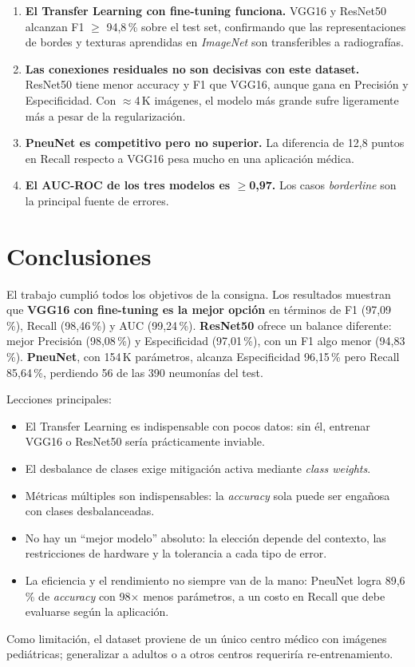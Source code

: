 \documentclass[1p,12pt]{elsarticle}
\begin{document}
\begin{enumerate}
  \item \textbf{El Transfer Learning con fine-tuning funciona.} VGG16 y ResNet50 alcanzan F1 $\geq$ 94,8\,\% sobre el test set, confirmando que las representaciones de bordes y texturas aprendidas en \textit{ImageNet} son transferibles a radiografías.
  \item \textbf{Las conexiones residuales no son decisivas con este dataset.} ResNet50 tiene menor accuracy y F1 que VGG16, aunque gana en Precisión y Especificidad. Con $\approx$4\,K imágenes, el modelo más grande sufre ligeramente más a pesar de la regularización.
  \item \textbf{PneuNet es competitivo pero no superior.} La diferencia de 12,8 puntos en Recall respecto a VGG16 pesa mucho en una aplicación médica.
  \item \textbf{El AUC-ROC de los tres modelos es $\geq$0,97.} Los casos \textit{borderline} son la principal fuente de errores.
\end{enumerate}

\section{Conclusiones}
\label{sec:conclusiones}

El trabajo cumplió todos los objetivos de la consigna. Los resultados muestran que \textbf{VGG16 con fine-tuning es la mejor opción} en términos de F1 (97,09\,\%), Recall (98,46\,\%) y AUC (99,24\,\%). \textbf{ResNet50} ofrece un balance diferente: mejor Precisión (98,08\,\%) y Especificidad (97,01\,\%), con un F1 algo menor (94,83\,\%). \textbf{PneuNet}, con 154\,K parámetros, alcanza Especificidad 96,15\,\% pero Recall 85,64\,\%, perdiendo 56 de las 390 neumonías del test.

Lecciones principales:
\begin{itemize}[noitemsep]
  \item El Transfer Learning es indispensable con pocos datos: sin él, entrenar VGG16 o ResNet50 sería prácticamente inviable.
  \item El desbalance de clases exige mitigación activa mediante \textit{class weights}.
  \item Métricas múltiples son indispensables: la \textit{accuracy} sola puede ser engañosa con clases desbalanceadas.
  \item No hay un ``mejor modelo'' absoluto: la elección depende del contexto, las restricciones de hardware y la tolerancia a cada tipo de error.
  \item La eficiencia y el rendimiento no siempre van de la mano: PneuNet logra 89,6\,\% de \textit{accuracy} con 98$\times$ menos parámetros, a un costo en Recall que debe evaluarse según la aplicación.
\end{itemize}

Como limitación, el dataset proviene de un único centro médico con imágenes pediátricas; generalizar a adultos o a otros centros requeriría re-entrenamiento.



\end{document}

